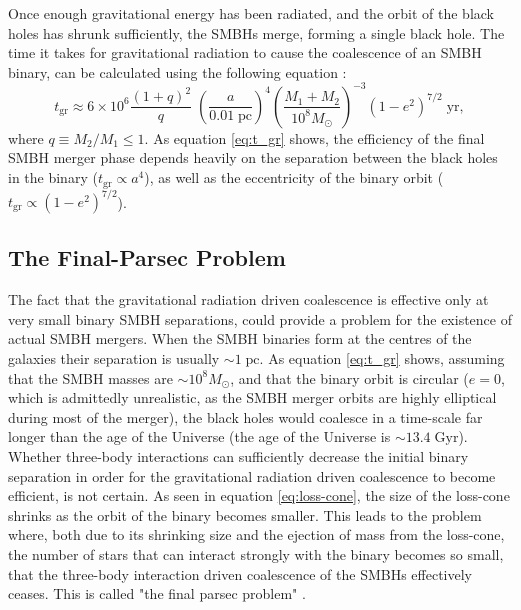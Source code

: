 \documentclass[english, twoside]{HYgradu}
\begin{document}
Once enough gravitational energy has been radiated, and the orbit of the black holes has shrunk sufficiently, the SMBHs merge, forming a single black hole. The time it takes for gravitational radiation to cause the coalescence of an SMBH binary, can be calculated using the following equation \citep{MerrittBook}:
\begin{equation}
t_\mathrm{gr} \approx 6 \times 10^6 \frac{(1+q)^2}{q} \; \left( \frac{a}{0.01 \; \mathrm{pc}} \right)^4 \left( \frac{M_1 + M_2}{10^8 M_\odot} \right)^{-3} (1-e^2)^{7/2} \; \mathrm{yr}, \label{eq:t_gr}
\end{equation}
where $q \equiv M_2/M_1 \leq 1$. As equation \ref{eq:t_gr} shows, the efficiency of the final SMBH merger phase depends heavily on the separation between the black holes in the binary ($t_\mathrm{gr} \propto a^4$), as well as the eccentricity of the binary orbit ($t_\mathrm{gr} \propto (1-e^2)^{7/2}$).

\subsection{The Final-Parsec Problem}

The fact that the gravitational radiation driven coalescence is effective only at very small binary SMBH separations, could provide a problem for the existence of actual SMBH mergers. When the SMBH binaries form at the centres of the galaxies their separation is usually $\sim 1 \; \mathrm{pc}$. As equation \ref{eq:t_gr} shows, assuming that the SMBH masses are $\sim 10^8 M_\odot$, and that the binary orbit is circular ($e = 0$, which is admittedly unrealistic, as the SMBH merger orbits are highly elliptical during most of the merger), the black holes would coalesce in a time-scale far longer than the age of the Universe (the age of the Universe is $\sim 13.4 \; \mathrm{Gyr}$). Whether three-body interactions can sufficiently decrease the initial binary separation in order for the gravitational radiation driven coalescence to become efficient, is not certain. As seen in equation \ref{eq:loss-cone}, the size of the loss-cone shrinks as the orbit of the binary becomes smaller. This leads to the problem where, both due to its shrinking size and the ejection of mass from the loss-cone, the number of stars that can interact strongly with the binary becomes so small, that the three-body interaction driven coalescence of the SMBHs effectively ceases. This is called "the final parsec problem" \citep{Milosavljevic2003}.
\end{document}
